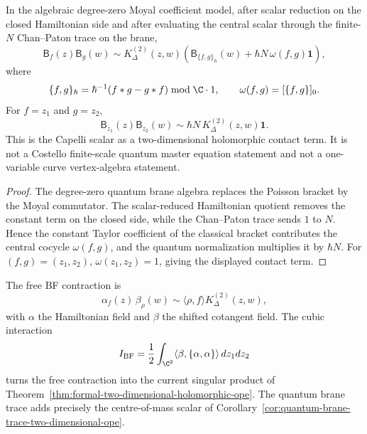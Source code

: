 \begin{cor}
\label{cor:quantum-brane-trace-two-dimensional-ope}
In the algebraic degree-zero Moyal coefficient model, after scalar
reduction on the closed Hamiltonian side and after evaluating the
central scalar through the finite-\(N\) Chan--Paton trace on the brane,
\[
  \mathsf{B}_f(z)\mathsf{B}_g(w)
  \sim
  K^{(2)}_\Delta(z,w)
  \left(
    \mathsf{B}_{\{f,g\}_\hbar}(w)
    +
    \hbar N\,\omega(f,g)\mathbf 1
  \right),
\]
where
\[
  \{f,g\}_\hbar=\hbar^{-1}(f*g-g*f)\bmod \C\cdot1,\qquad
  \omega(f,g)=[\{f,g\}]_0 .
\]
For \(f=z_1\) and \(g=z_2\),
\[
  \mathsf{B}_{z_1}(z)\mathsf{B}_{z_2}(w)
  \sim
  \hbar N\,K^{(2)}_\Delta(z,w)\mathbf 1 .
\]
This is the Capelli scalar as a two-dimensional holomorphic contact term.
It is not a Costello finite-scale quantum master equation statement and
not a one-variable curve vertex-algebra statement.
\end{cor}

\begin{proof}
The degree-zero quantum brane algebra replaces the Poisson bracket by
the Moyal commutator.  The scalar-reduced Hamiltonian quotient removes
the constant term on the closed side, while the Chan--Paton trace sends
\(1\) to \(N\).  Hence the constant Taylor coefficient of the classical
bracket contributes the central cocycle \(\omega(f,g)\), and the
quantum normalization multiplies it by \(\hbar N\).  For
\((f,g)=(z_1,z_2)\), \(\omega(z_1,z_2)=1\), giving the displayed
contact term.
\end{proof}

\begin{rmk}
The free BF contraction is
\[
  \alpha_f(z)\,\beta_\rho(w)
  \sim
  \langle\rho,f\rangle K^{(2)}_\Delta(z,w),
\]
with \(\alpha\) the Hamiltonian field and \(\beta\) the shifted
cotangent field.  The cubic interaction
\[
  I_{\mathrm{BF}}
  =
  \frac12\int_{\C^2}\langle\beta,\{\alpha,\alpha\}\rangle\,dz_1dz_2
\]
turns the free contraction into the current singular product of
Theorem~\ref{thm:formal-two-dimensional-holomorphic-ope}.  The quantum
brane trace adds precisely the centre-of-mass scalar of
Corollary~\ref{cor:quantum-brane-trace-two-dimensional-ope}.
\end{rmk}
